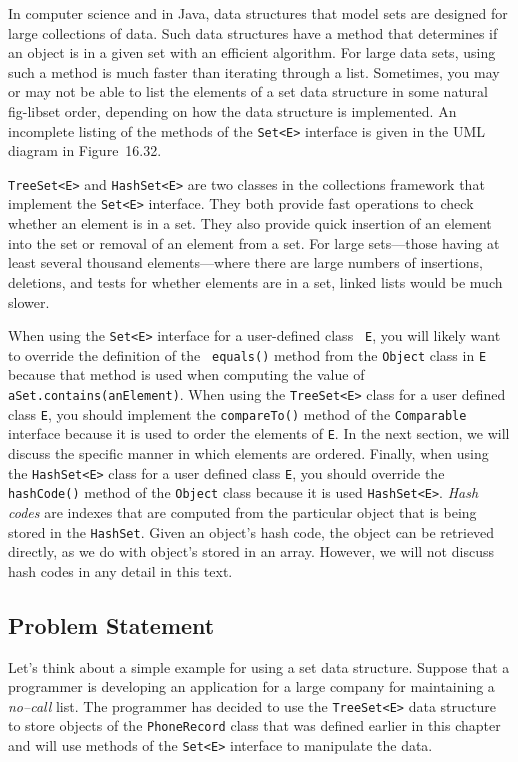 In computer science and in Java, data structures that model sets are
designed for large collections of data.  Such data structures have a
method that determines if an object is in a given set with an
efficient algorithm. For large data sets, using such a method is much
faster than iterating through a list. Sometimes, you may or may not be
able to list the elements of a set data structure in some natural
{fig-libset}
\noindent order, depending on how the data structure is implemented. An
incomplete listing of the methods of the {\tt Set<E>} interface is
given in the UML diagram in Figure~16.32.

{\tt TreeSet<E>} and {\tt HashSet<E>} are two classes in the
collections framework that implement the {\tt Set<E>} interface. They
both provide fast operations to check whether an element is in a set.
They also provide quick insertion of an element into the set or
removal of an element from a set.  For large sets---those having at
least several thousand elements---where there are large numbers of
insertions, deletions, and tests for whether elements are in a set,
linked lists would be much slower.

When using the {\tt Set<E>} interface for a user-defined class {\tt
E}, you will likely want to override the definition of the {\tt
equals()} method from the {\tt Object} class in {\tt E} because that
method is used when computing the value of {\tt
aSet.contains(anElement)}. When using the {\tt TreeSet<E>} class for a
user defined class {\tt E}, you should implement the {\tt compareTo()}
method of the {\tt Comparable} interface because it is used to order
the elements of {\tt E}. In the next section, we will discuss the
specific manner in which elements are ordered.  Finally, when using
the {\tt HashSet<E>} class for a user defined class {\tt E}, you
should override the {\tt hashCode()} method of the {\tt Object} class
because it is used {\tt HashSet<E>}.  {\em Hash codes} are indexes
that are computed from the particular object that is being stored in
the {\tt HashSet}. Given an object's hash code, the object can
be retrieved directly, as we do with object's stored in an array.
However, we will not discuss hash codes in any detail in this text.

\subsection*{Problem Statement}
Let's think about a simple example for using a set data
structure. Suppose that a programmer is developing an application for
a large company for maintaining a {\em no--call} list.  The programmer
has decided to use the {\tt TreeSet<E>} data structure to store
objects of the {\tt PhoneRecord} class that was defined earlier in
this chapter and will use methods of the {\tt Set<E>} interface to
manipulate the data.  

